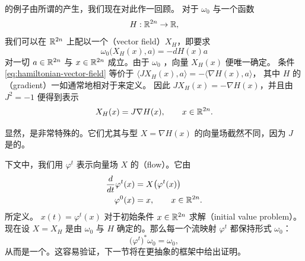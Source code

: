 \trSymplecticDiffeomorphism{}的例子由所谓的\trHamiltonianVectorField{}产生，我们现在对此作一回顾。%
对于\trSymplecticForm{} $\omega_0$ 与一个\trSmooth{}函数
\[
H:\mathbb{R}^{2n}\to\mathbb{R},
\]
我们可以在 $\mathbb{R}^{2n}$ 上配以一个\textbf{\trVectorField}（vector field）$X_H$，即要求
\begin{equation}\label{eq:hamiltonian-vector-field}
\omega_0\bigl(X_H(x),a\bigr)=-dH(x)a
\end{equation}
对一切 $a\in\mathbb{R}^{2n}$ 与 $x\in\mathbb{R}^{2n}$ 成立。由于 $\omega_0$ \trNondegenerate，向量 $X_H(x)$ 便唯一确定。%
条件 \eqref{eq:hamiltonian-vector-field} 等价于 $\langle JX_H(x),a\rangle=-\langle\nabla H(x),a\rangle$，%
其中 $H$ 的\textbf{\trGradient}（gradient）一如通常地相对于\trEuclidean\trInnerProduct{}来定义。%
因此 $JX_H(x)=-\nabla H(x)$，并且由 $J^{2}=-1$ 便得到表示
\begin{equation}\label{eq:xh-representation}
X_H(x)=J\nabla H(x),\qquad x\in\mathbb{R}^{2n}.
\end{equation}

显然，\trHamiltonianVectorField{}是非常特殊的。它们尤其与\trGradient{}型 $X=\nabla H(x)$ 的向量场截然不同，因为 $J$ 是\trAntisymmetric{}的。

下文中，我们用 $\varphi^{t}$ 表示向量场 $X$ 的\textbf{\trFlow}（flow）。它由
\begin{align*}
\frac{d}{dt}\varphi^{t}(x) &= X\bigl(\varphi^{t}(x)\bigr)\\
\varphi^{0}(x) &= x,\qquad x\in\mathbb{R}^{2n}.
\end{align*}
所定义。\trCurve{} $x(t)=\varphi^{t}(x)$ 对于初始条件 $x\in\mathbb{R}^{2n}$ 求解\trCauchy{}\textbf{\trInitialValueProblem}（initial value problem）。%
现在设 $X=X_H$ 是由 $\omega_0$ 与 $H$ 确定的\trHamiltonianVectorField。那么每一个流映射 $\varphi^{t}$ 都保持形式 $\omega_0$：
\begin{equation}\label{eq:flow-preserves-form}
\bigl(\varphi^{t}\bigr)^{*}\omega_0=\omega_0,
\end{equation}
从而是一个\trSymplecticMapping。这容易验证，下一节将在更抽象的框架中给出证明。

